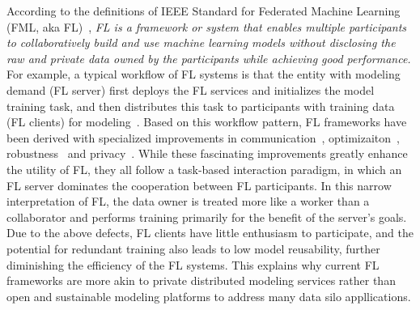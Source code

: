 According to the definitions of IEEE Standard for Federated Machine Learning (FML, aka FL)~\cite{IEEEstd3652}, \textit{FL is a framework or system that enables multiple participants to collaboratively build and use machine learning models without disclosing the raw and private data owned by the participants while achieving good performance.}
For example, a typical workflow of FL systems is that the entity with modeling demand (FL server) first deploys the FL services and initializes the model training task, and then distributes this task to participants with training data (FL clients) for modeling~\cite{bonawitz2019towards}.
Based on this workflow pattern, FL frameworks have been derived with specialized improvements in communication~\cite{konevcny2016federated, mcmahan2017communication, xu2023asynchronous}, optimizaiton~\cite{li2018federated, karimireddy2020scaffold, li2021model}, robustness~\cite{duan2020self, sattler2019robust, li2022federated} and privacy~\cite{bonawitz2017practical, geyer2017differentially, cheng2021secureboost}.
While these fascinating improvements greatly enhance the utility of FL, they all follow a task-based interaction paradigm, in which an FL server dominates the cooperation between FL participants.
In this narrow interpretation of FL, the data owner is treated more like a worker than a collaborator and performs training primarily for the benefit of the server's goals.
Due to the above defects, FL clients have little enthusiasm to participate, and the potential for redundant training also leads to low model reusability, further diminishing the efficiency of the FL systems.
This explains why current FL frameworks are more akin to private distributed modeling services rather than open and sustainable modeling platforms to address many data silo appllications.

